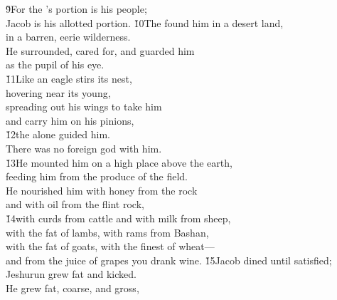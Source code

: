 \begin{poetry}
\poeml \v{9}For the 's portion is his people; \\
\poemll    Jacob is his allotted portion.
\poeml \v{10}The  found him in a desert land, \\
\poemll    in a barren, eerie wilderness. \\
\poeml He surrounded, cared for, and guarded him \\
\poemll    as the pupil of his eye. \\
\poeml \v{11}Like an eagle stirs its nest, \\
\poemll    hovering near its young, \\
\poeml spreading out his wings to take him \\
\poemll    and carry him on his pinions, \\
\poeml \v{12}the  alone guided him. \\
\poemll    There was no foreign god with him. \\
\poeml \v{13}He mounted him on a high place above the earth, \\
\poemll    feeding him from the produce of the field. \\
\poeml He nourished him with honey from the rock \\
\poemll    and with oil from the flint rock, \\
\poeml \v{14}with curds from cattle and with milk from sheep, \\
\poemll    with the fat of lambs, with rams from Bashan, \\
\poeml with the fat of goats, with the finest of wheat--- \\
\poemll    and from the juice of grapes you drank wine.
\poeml \v{15}Jacob dined until satisfied; \\
\poemll    Jeshurun grew fat and kicked. \\
\poeml He grew fat, coarse, and gross, \\

\end{poetry}
